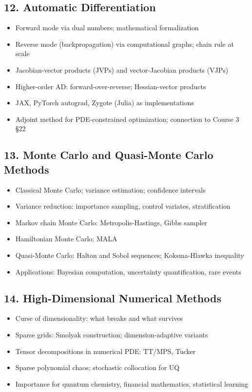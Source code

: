 \subsection{12. Automatic Differentiation}
\begin{itemize}
\item Forward mode via dual numbers; mathematical formalization
\item Reverse mode (backpropagation) via computational graphs; chain rule at scale
\item Jacobian-vector products (JVPs) and vector-Jacobian products (VJPs)
\item Higher-order AD: forward-over-reverse; Hessian-vector products
\item JAX, PyTorch autograd, Zygote (Julia) as implementations
\item Adjoint method for PDE-constrained optimization; connection to Course 3 §22
\end{itemize}

\subsection{13. Monte Carlo and Quasi-Monte Carlo Methods}
\begin{itemize}
\item Classical Monte Carlo; variance estimation; confidence intervals
\item Variance reduction: importance sampling, control variates, stratification
\item Markov chain Monte Carlo: Metropolis-Hastings, Gibbs sampler
\item Hamiltonian Monte Carlo; MALA
\item Quasi-Monte Carlo: Halton and Sobol sequences; Koksma-Hlawka inequality
\item Applications: Bayesian computation, uncertainty quantification, rare events
\end{itemize}

\subsection{14. High-Dimensional Numerical Methods}
\begin{itemize}
\item Curse of dimensionality: what breaks and what survives
\item Sparse grids: Smolyak construction; dimension-adaptive variants
\item Tensor decompositions in numerical PDE: TT/MPS, Tucker
\item Sparse polynomial chaos; stochastic collocation for UQ
\item Importance for quantum chemistry, financial mathematics, statistical learning
\end{itemize}

